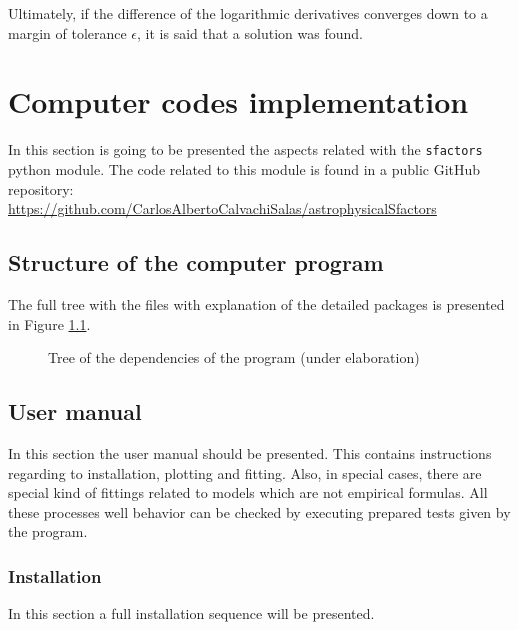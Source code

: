 \documentclass[openany]{book}
\begin{document}
Ultimately, if the difference of the logarithmic derivatives converges down to a margin of tolerance $\epsilon$, it is said that a solution was found. 

\chapter{Computer codes implementation} \label{ap:codes}

In this section is going to be presented the aspects related with the \texttt{sfactors} python module. The code related to this module is found in a public GitHub repository:  \\

\href{https://github.com/CarlosAlbertoCalvachiSalas/astrophysicalSfactors}{https://github.com/CarlosAlbertoCalvachiSalas/astrophysicalSfactors}

\section{Structure of the computer program} \label{sec:programStructure}

The full tree with the files with explanation of the detailed packages is presented in Figure \ref{fig:programTree}.

\begin{figure}[H]
	
	\caption[Tree of the dependencies of the program]{Tree of the dependencies of the program (under elaboration)}
	\label{fig:programTree}
\end{figure}

\section{User manual} \label{sec:userManual}

In this section the user manual should be presented. This contains instructions regarding to installation, plotting and fitting. Also, in special cases, there are special kind of fittings related to models which are not empirical formulas. All these processes well behavior can be checked by executing prepared tests given by the program.

\subsection{Installation} \label{sub:codesInstallation}

In this section a full installation sequence will be presented. \\
\end{document}
